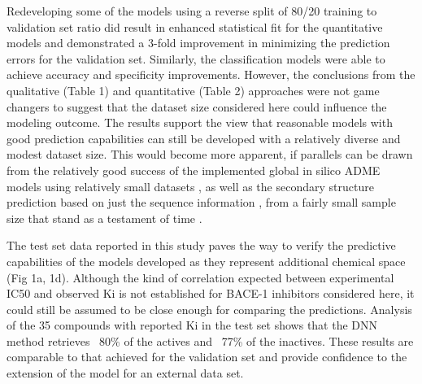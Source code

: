 Redeveloping some of the models using a reverse split of 80/20 training to validation set ratio did result in enhanced statistical fit for the quantitative models and demonstrated a 3-fold improvement in minimizing the prediction errors for the validation set.  Similarly, the classification models were able to achieve accuracy and specificity improvements.  However, the conclusions from the qualitative (Table 1) and quantitative (Table 2) approaches were not game changers to suggest that the dataset size considered here could influence the modeling outcome.  The results support the view that reasonable models with good prediction capabilities can still be developed with a relatively diverse and modest dataset size. This would become more apparent, if parallels can be drawn from the relatively good success of the implemented global in silico ADME models using relatively small datasets \cite{gleeson2011silico, peach2012computational}, as well as the secondary structure prediction based on just the sequence information \cite{kabsch1983good, drozdetskiy2015jpred4}, from a fairly small sample size that stand as a testament of time \cite{chou1974conformational}.   

The test set data reported in this study paves the way to verify the predictive capabilities of the models developed as they represent additional chemical space (Fig 1a, 1d).  Although the kind of correlation expected between experimental IC50 and observed Ki is not established for BACE-1 inhibitors considered here, it could still be assumed to be close enough for comparing the predictions.  Analysis of the 35 compounds with reported Ki in the test set shows that the DNN method retrieves ~80\% of the actives and ~77\% of the inactives.  These results are comparable to that achieved for the validation set and provide confidence to the extension of the model for an external data set. 

